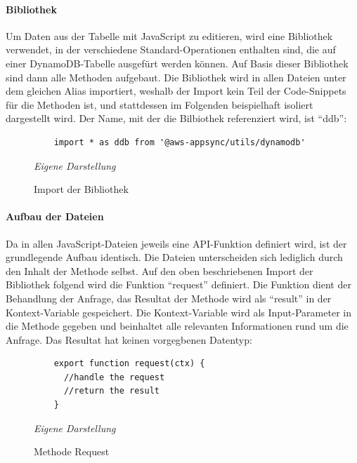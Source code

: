 \paragraph{Bibliothek}
Um Daten aus der Tabelle mit JavaScript zu editieren, wird eine Bibliothek verwendet, in der verschiedene Standard-Operationen enthalten sind, die auf einer DynamoDB-Tabelle ausgefürt werden können. Auf Basis dieser Bibliothek sind dann alle Methoden aufgebaut. Die Bibliothek wird in allen Dateien unter dem gleichen Alias importiert, weshalb der Import kein Teil der Code-Snippets für die Methoden ist, und stattdessen im Folgenden beispielhaft isoliert dargestellt wird. Der Name, mit der die Bilbiothek referenziert wird, ist ``ddb'':\newline
	\begin{figure}[H]
	\centering
	\begin{minipage}[t]{.7\textwidth} %
	\caption{Import der Bibliothek} %
	\begin{verbatim}
	import * as ddb from '@aws-appsync/utils/dynamodb'
	\end{verbatim}
	
	\textit{Eigene Darstellung} %
	\label{fig:bibliothekImport}
	\end{minipage}
	\end{figure}
\paragraph{Aufbau der Dateien}
Da in allen JavaScript-Dateien jeweils eine API-Funktion definiert wird, ist der grundlegende Aufbau identisch. Die Dateien unterscheiden sich lediglich durch den Inhalt der Methode selbst. 
Auf den oben beschriebenen Import der Bibliothek folgend wird die Funktion ``request'' definiert. Die Funktion dient der Behandlung der Anfrage, das Resultat der Methode wird als ``result'' in der Kontext-Variable gespeichert. Die Kontext-Variable wird als Input-Parameter in die Methode gegeben und beinhaltet alle relevanten Informationen rund um die Anfrage. Das Resultat hat keinen vorgegbenen Datentyp:\newline
	\begin{figure}[H]
	\centering
	\begin{minipage}[t]{.7\textwidth} %
	\caption{Methode Request} %
	\begin{verbatim}
	export function request(ctx) {
	  //handle the request
	  //return the result
	}
	\end{verbatim}
	
	\textit{Eigene Darstellung} %
	\label{fig:requestMethode}
	\end{minipage}
	\end{figure}

